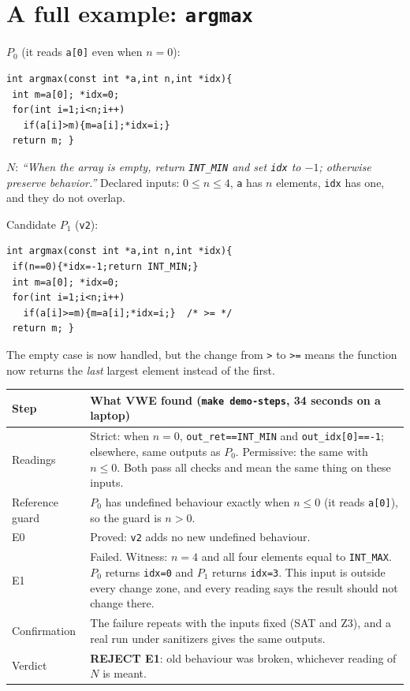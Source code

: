 \documentclass[10pt,a4paper]{article}
\newcommand{\Pz}{P_0}\newcommand{\Po}{P_1}
\begin{document}
\section{A full example: \texttt{argmax}}
\begin{minipage}[t]{0.48\linewidth}
$\Pz$ (it reads \texttt{a[0]} even when $n=0$):
\begin{lstlisting}
int argmax(const int *a,int n,int *idx){
 int m=a[0]; *idx=0;
 for(int i=1;i<n;i++)
   if(a[i]>m){m=a[i];*idx=i;}
 return m; }
\end{lstlisting}
$N$: \emph{``When the array is empty, return \texttt{INT\_MIN} and set \texttt{idx} to $-1$;
otherwise preserve behavior.''} Declared inputs: $0\le n\le 4$, \texttt{a} has $n$ elements,
\texttt{idx} has one, and they do not overlap.
\end{minipage}\hfill
\begin{minipage}[t]{0.49\linewidth}
Candidate $\Po$ (\texttt{v2}):
\begin{lstlisting}
int argmax(const int *a,int n,int *idx){
 if(n==0){*idx=-1;return INT_MIN;}
 int m=a[0]; *idx=0;
 for(int i=1;i<n;i++)
   if(a[i]>=m){m=a[i];*idx=i;}  /* >= */
 return m; }
\end{lstlisting}
The empty case is now handled, but the change from \texttt{>} to \texttt{>=} means the function
now returns the \emph{last} largest element instead of the first.
\end{minipage}

\medskip
\noindent\begin{tabularx}{\linewidth}{@{}lX@{}}\toprule
Step & What VWE found (\texttt{make demo-steps}, 34 seconds on a laptop)\\\midrule
Readings & Strict: when $n=0$, \texttt{out\_ret==INT\_MIN} and \texttt{out\_idx[0]==-1}; elsewhere,
same outputs as $\Pz$. Permissive: the same with $n\le 0$. Both pass all checks and mean the same
thing on these inputs.\\
Reference guard & $\Pz$ has undefined behaviour exactly when $n\le0$ (it reads \texttt{a[0]}), so
the guard is $n>0$.\\
E0 & Proved: \texttt{v2} adds no new undefined behaviour.\\
E1 & Failed. Witness: $n=4$ and all four elements equal to \texttt{INT\_MAX}. $\Pz$ returns
\texttt{idx=0} and $\Po$ returns \texttt{idx=3}. This input is outside every change zone, and every
reading says the result should not change there.\\
Confirmation & The failure repeats with the inputs fixed (SAT and Z3), and a real run under
sanitizers gives the same outputs.\\
Verdict & \textbf{REJECT E1}: old behaviour was broken, whichever reading of $N$ is meant.\\\bottomrule
\end{tabularx}
\end{document}
